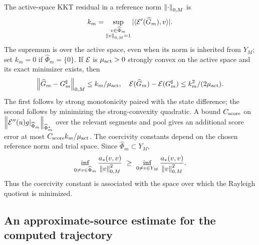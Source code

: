 \documentclass[11pt]{article}
\theoremstyle{remark}
\begin{document}
The active-space KKT residual in a reference norm $\left\lVert\cdot\right\rVert_{0,M}$ is
\begin{equation}
 k_m=\sup_{\substack{v\in\widehat\Phi_m\\\left\lVert v\right\rVert_{0,M}=1}}
              |\langle\mathcal E'(\widehat G_m),v\rangle|.
 \label{eq:c5-kkt}
\end{equation}
The supremum is over the active space, even when its norm is inherited
from $Y_M$; set $k_m=0$ if $\widehat\Phi_m=\{0\}$.
If $\mathcal E$ is $\mu_{\rm act}>0$ strongly convex on the active
space and its exact minimizer exists, then
\[
 \left\lVert\widehat G_m-G_m^\sharp\right\rVert_{0,M}\leq k_m/\mu_{\rm act},\quad
 \mathcal E(\widehat G_m)-\mathcal E(G_m^\sharp)\leq k_m^2/(2\mu_{\rm act}).
\]
The first follows by strong monotonicity paired with the state difference;
the second follows by minimizing the strong-convexity quadratic.
A bound $C_{\rm score}$ on
$\left\lVert\mathcal E''(u)g|_{\widehat\Phi_m}\right\rVert_{\widehat\Phi_m^*}$ over the
relevant segments and pool gives an additional score error at most
$C_{\rm score}k_m/\mu_{\rm act}$.
The coercivity constants depend on the chosen reference norm and trial space. Since $\widehat\Phi_m\subset Y_M$,
\[
 \inf_{0\ne v\in\widehat\Phi_m}\frac{a_*(v,v)}{\left\lVert v\right\rVert_{0,M}^2}
 \ \geq\
 \inf_{0\ne v\in Y_M}\frac{a_*(v,v)}{\left\lVert v\right\rVert_{0,M}^2}.
\]
Thus the coercivity constant is associated with the space over which the Rayleigh quotient is minimized.

\subsection{An approximate-source estimate for the computed trajectory}
\label{sec:c5-source}
\end{document}
